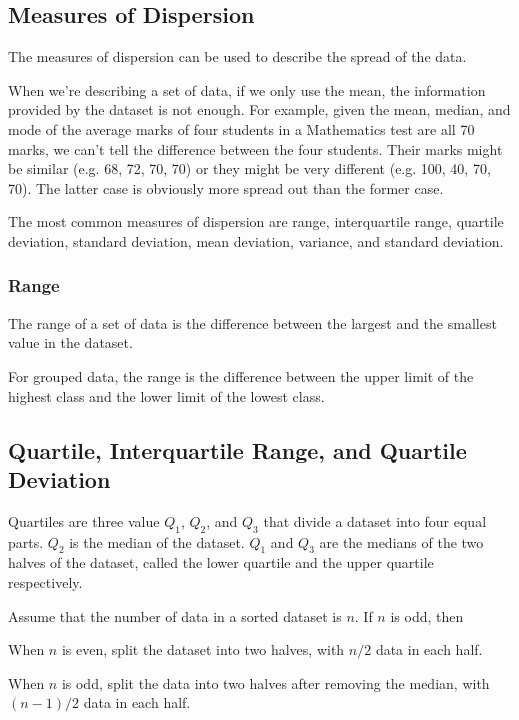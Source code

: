 \documentclass{report}
\begin{document}
\begin{multicols}{2}
  \section{Measures of Dispersion}

  The measures of dispersion can be used to describe the spread of the data.

  When we're describing a set of data, if we only use the mean, the information
  provided by the dataset is not enough. For example, given the mean, median, and
  mode of the average marks of four students in a Mathematics test are all 70
  marks, we can't tell the difference between the four students. Their marks
  might be similar (e.g. 68, 72, 70, 70) or they might be very different (e.g.
  100, 40, 70, 70). The latter case is obviously more spread out than the former
  case.

  The most common measures of dispersion are range, interquartile range, quartile
  deviation, standard deviation, mean deviation, variance, and standard
  deviation.

  \subsubsection*{Range}

  The range of a set of data is the difference between the largest and the
  smallest value in the dataset.

  For grouped data, the range is the difference between the upper limit of the
  highest class and the lower limit of the lowest class.

  \subsection*{Quartile, Interquartile Range, and Quartile Deviation}

  Quartiles are three value $Q_1$, $Q_2$, and $Q_3$ that divide a dataset into
  four equal parts. $Q_2$ is the median of the dataset. $Q_1$ and $Q_3$ are the
  medians of the two halves of the dataset, called the lower quartile and the
  upper quartile respectively.

  Assume that the number of data in a sorted dataset is $n$. If $n$ is odd, then

  When $n$ is even, split the dataset into two halves, with $n/2$ data in each
  half.

  When $n$ is odd, split the data into two halves after removing the median, with
  $(n-1)/2$ data in each half.


\end{multicols}
\end{document}
